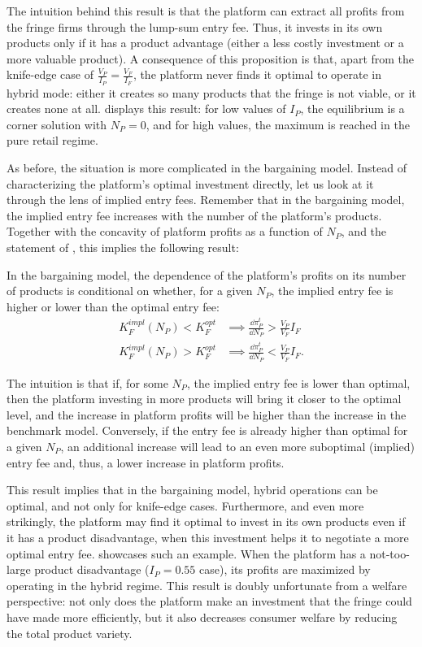 The intuition behind this result is that the platform can extract all profits from the fringe firms through the lump-sum entry fee.
Thus, it invests in its own products only if it has a product advantage (either a less costly investment or a more valuable product).
A consequence of this proposition is that, apart from the knife-edge case of $\frac{V_P}{I_P} = \frac{V_F}{I_F}$, the platform never finds it optimal to operate in hybrid mode: either it creates so many products that the fringe is not viable, or it creates none at all.
 displays this result: for low values of $I_P$, the equilibrium is a corner solution with $N_P = 0$, and for high values, the maximum is reached in the pure retail regime.

As before, the situation is more complicated in the bargaining model.
Instead of characterizing the platform's optimal investment directly, let us look at it through the lens of implied entry fees.
Remember that in the bargaining model, the implied entry fee increases with the number of the platform's products.
Together with the concavity of platform profits as a function of $N_P$, and the statement of , this implies the following result:
\begin{proposition}
    \label{prop:comparative_n_p_bargaining}
    In the bargaining model, the dependence of the platform's profits on its number of products is conditional on whether, for a given $N_P$,  the implied entry fee is higher or lower than the optimal entry fee:
    \begin{align*}
        K_F^{impl}(N_P) < K_F^{opt} &\implies \frac{\dd \pi_P^t}{\dd N_P} > \frac{V_P}{V_F} I_F \\
        K_F^{impl}(N_P) > K_F^{opt} &\implies \frac{\dd \pi_P^t}{\dd N_P} < \frac{V_P}{V_F} I_F.
    \end{align*}
\end{proposition}
The intuition is that if, for some $N_P$, the implied entry fee is lower than optimal, then the platform investing in more products will bring it closer to the optimal level, and the increase in platform profits will be higher than the increase in the benchmark model.
Conversely, if the entry fee is already higher than optimal for a given $N_P$, an additional increase will lead to an even more suboptimal (implied) entry fee and, thus, a lower increase in platform profits.

This result implies that in the bargaining model, hybrid operations can be optimal, and not only for knife-edge cases.
Furthermore, and even more strikingly, the platform may find it optimal to invest in its own products even if it has a product disadvantage, when this investment helps it to negotiate a more optimal entry fee.
 showcases such an example.
When the platform has a not-too-large product disadvantage ($I_P = 0.55$ case), its profits are maximized by operating in the hybrid regime.
This result is doubly unfortunate from a welfare perspective: not only does the platform make an investment that the fringe could have made more efficiently, but it also decreases consumer welfare by reducing the total product variety.

